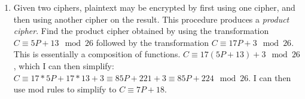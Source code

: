 \documentclass{article}
\begin{document}
\begin{enumerate}
    \item Given two ciphers, plaintext may be encrypted by first using one cipher, and then using another cipher on the result. This procedure produces a \textit{product cipher}. Find the product cipher obtained by using the transformation $C \equiv 5P + 13 \mod{26}$ followed by the transformation $C \equiv 17P + 3 \mod{26}$.\\
          This is essentially a composition of functions. $C \equiv 17(5P + 13) + 3 \mod{26}$, which I can then simplify: $C \equiv 17*5P + 17*13 + 3 \equiv 85P + 221 + 3 \equiv 85P + 224 \mod{26}$. I can then use mod rules to simplify to $C \equiv 7P + 18$.
\end{enumerate}
\end{document}
